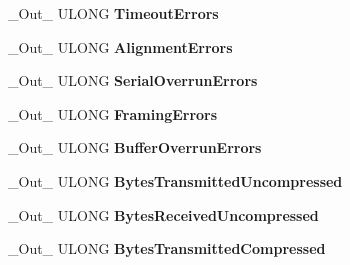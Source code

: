 \begin{DoxyCompactItemize}
\+\_\+\+Out\+\_\+ U\+L\+O\+NG {\bfseries Timeout\+Errors}
\item 
\mbox{\label{struct___n_d_i_s___w_a_n___c_o___g_e_t___s_t_a_t_s___i_n_f_o_a8ba5d7e2bedef3fde84db1a774ba3db6}} 
\+\_\+\+Out\+\_\+ U\+L\+O\+NG {\bfseries Alignment\+Errors}
\item 
\mbox{\label{struct___n_d_i_s___w_a_n___c_o___g_e_t___s_t_a_t_s___i_n_f_o_a2d462a77033d86cb70067531631019f4}} 
\+\_\+\+Out\+\_\+ U\+L\+O\+NG {\bfseries Serial\+Overrun\+Errors}
\item 
\mbox{\label{struct___n_d_i_s___w_a_n___c_o___g_e_t___s_t_a_t_s___i_n_f_o_a488b7cdc196ebb2c2d2639642ca23b57}} 
\+\_\+\+Out\+\_\+ U\+L\+O\+NG {\bfseries Framing\+Errors}
\item 
\mbox{\label{struct___n_d_i_s___w_a_n___c_o___g_e_t___s_t_a_t_s___i_n_f_o_ac6ed314aea880c7a77df9ac7e8d63a27}} 
\+\_\+\+Out\+\_\+ U\+L\+O\+NG {\bfseries Buffer\+Overrun\+Errors}
\item 
\mbox{\label{struct___n_d_i_s___w_a_n___c_o___g_e_t___s_t_a_t_s___i_n_f_o_a43d435c7a21b477c4ef6213f2695c51e}} 
\+\_\+\+Out\+\_\+ U\+L\+O\+NG {\bfseries Bytes\+Transmitted\+Uncompressed}
\item 
\mbox{\label{struct___n_d_i_s___w_a_n___c_o___g_e_t___s_t_a_t_s___i_n_f_o_a4d8af1759b63f8be5751a498a327309b}} 
\+\_\+\+Out\+\_\+ U\+L\+O\+NG {\bfseries Bytes\+Received\+Uncompressed}
\item 
\mbox{\label{struct___n_d_i_s___w_a_n___c_o___g_e_t___s_t_a_t_s___i_n_f_o_a997034138fa2491ca6ad63096e542492}} 
\+\_\+\+Out\+\_\+ U\+L\+O\+NG {\bfseries Bytes\+Transmitted\+Compressed}
\item 
\mbox{\label{struct___n_d_i_s___w_a_n___c_o___g_e_t___s_t_a_t_s___i_n_f_o_ad6eb6f31a21c1963c63646a22d4f12db}} 

\end{DoxyCompactItemize}
